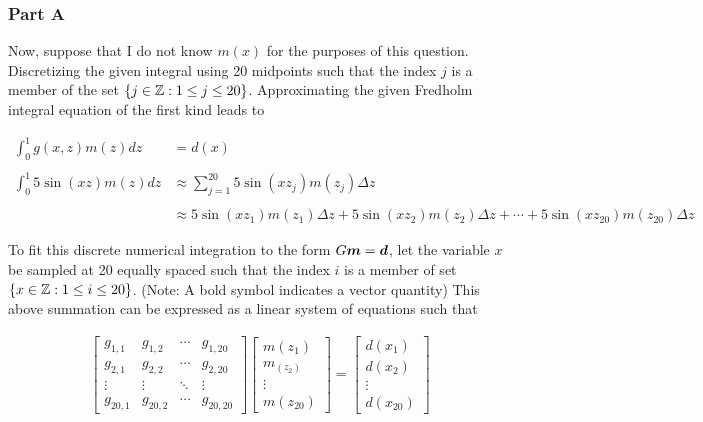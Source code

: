 \subsubsection*{Part A}

Now, suppose that I do not know $m(x)$ for the purposes of this question. Discretizing the given integral using 20 midpoints such that the index $j$ is a member of the set $\{j \in \mathbb{Z} : 1 \leq j \leq 20\}$. Approximating the given Fredholm integral equation of the first kind leads to

\begin{align*}
	\int_{0}^{1} g(x,z) m(z) dz &= d(x) \\
	\\
	\int_{0}^{1} 5 \sin(xz) m(z) dz &\approx \sum_{j = 1}^{20} 5 \sin(xz_{j}) m(z_{j}) \Delta z \\
	\\
	&\approx 5 \sin(xz_{1}) m(z_{1}) \Delta z + 5 \sin(xz_{2}) m(z_{2}) \Delta z + \cdots + 5 \sin(xz_{20}) m(z_{20}) \Delta z
\end{align*}

To fit this discrete numerical integration to the form $G\boldsymbol{m} = \boldsymbol{d}$, let the variable $x$ be sampled at 20 equally spaced such that the index $i$ is a member of set $\{x \in \mathbb{Z} : 1 \leq i \leq 20\}$. (Note: A bold symbol indicates a vector quantity) This above summation can be expressed as a linear system of equations such that

\begin{align*}
	\begin{bmatrix}
		g_{1,1} & g_{1,2} & \cdots & g_{1,20} \\ 
		g_{2,1} & g_{2,2} & \cdots & g_{2,20} \\ 
		\vdots & \vdots & \ddots & \vdots \\
		g_{20,1} & g_{20,2} & \cdots & g_{20,20}
	\end{bmatrix}
	\begin{bmatrix}
		m(z_{1}) \\ m_(z_{2}) \\ \vdots \\ m(z_{20})
	\end{bmatrix}
	= \begin{bmatrix}
		d(x_{1}) \\ d(x_{2}) \\ \vdots \\ d(x_{20})
	\end{bmatrix}
\end{align*}

